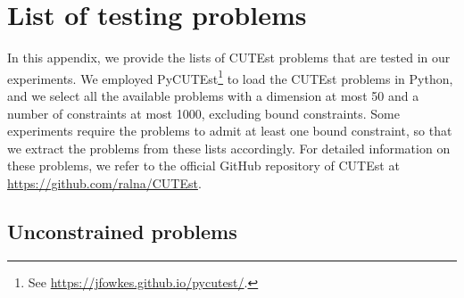 %
%
%
\chapter{List of testing problems}

In this appendix, we provide the lists of CUTEst problems that are tested in our experiments.
We employed PyCUTEst\footnote{See \url{https://jfowkes.github.io/pycutest/}.} to load the CUTEst problems in Python, and we select all the available problems with a dimension at most \num{50} and a number of constraints at most \num[group-minimum-digits=4]{1000}, excluding bound constraints.
Some experiments require the problems to admit at least one bound constraint, so that we extract the problems from these lists accordingly.
For detailed information on these problems, we refer to the official GitHub repository of CUTEst at \url{https://github.com/ralna/CUTEst}.

\section{Unconstrained problems}
\label{sec:list-unconstrained-problems}


